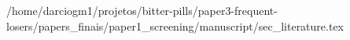 /home/darciogm1/projetos/bitter-pills/paper3-frequent-losers/papers_finais/paper1_screening/manuscript/sec_literature.tex